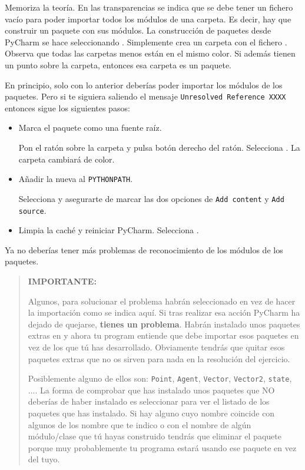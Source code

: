 Memoriza la teoría. En las transparencias se indica que se debe tener un fichero vacío  para poder importar todos los módulos de una carpeta. Es decir, hay que construir un paquete con sus módulos. La construcción de paquetes desde PyCharm se hace seleccionando  . Simplemente crea un carpeta con el fichero . Observa que todas las carpetas menos  están en el mismo color. Si además tienen un punto sobre la carpeta, entonces esa carpeta es un paquete.



En principio, solo con lo anterior deberías poder importar los módulos de los paquetes. Pero si te siguiera saliendo el mensaje \texttt{Unresolved Reference XXXX} entonces sigue los siguientes pasos:

\begin{itemize}
\item Marca el paquete como una fuente raíz. 

Pon el ratón sobre la carpeta y pulsa botón derecho del ratón. Selecciona . La carpeta cambiará de color.


\item Añadir la nueva al \texttt{PYTHONPATH}. 

Selecciona    y asegurarte de marcar las dos opciones de \texttt{Add content} y  \texttt{Add source}.

\item Limpia la caché y reiniciar PyCharm. Selecciona .

\end{itemize}

Ya no deberías tener más problemas de reconocimiento de los módulos de los paquetes.

\begin{quote}
\textbf{IMPORTANTE: }

Algunos, para solucionar el problema habrán seleccionado  en vez de hacer la importación como se indica aquí. Si tras realizar esa acción PyCharm ha dejado de quejarse, \textbf{tienes un problema}. Habrán instalado unos paquetes extras en  y ahora tu program entiende que debe importar esos paquetes en vez de los que tú has desarrollado. Obviamente tendrás que quitar esos paquetes extras que no os sirven para nada en la resolución del ejercicio. 

Posiblemente alguno de ellos son: \texttt{Point}, \texttt{Agent}, \texttt{Vector}, \texttt{Vector2}, \texttt{state}, .... La forma de comprobar que has instalado unos paquetes que NO deberías de haber instalado es seleccionar  para ver el listado de los paquetes que has instalado. Si hay alguno cuyo nombre coincide con algunos de los nombre que te indico o con el nombre de algún módulo/clase que tú hayas construido tendrás que eliminar el paquete porque muy probablemente tu programa estará usando ese paquete en vez del tuyo.
\end{quote}
